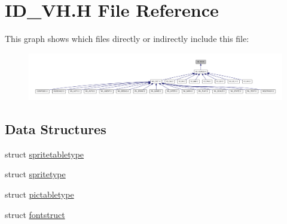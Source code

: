 \hypertarget{ID__VH_8H}{
\section{ID\_\-VH.H File Reference}
\label{ID__VH_8H}
}
This graph shows which files directly or indirectly include this file:
\nopagebreak
\begin{figure}[H]
\begin{center}
\leavevmode
\includegraphics[width=400pt]{ID__VH_8H__dep__incl}
\end{center}
\end{figure}
\subsection*{Data Structures}
\begin{DoxyCompactItemize}
\item 
struct \hyperlink{structspritetabletype}{spritetabletype}
\item 
struct \hyperlink{structspritetype}{spritetype}
\item 
struct \hyperlink{structpictabletype}{pictabletype}
\item 
struct \hyperlink{structfontstruct}{fontstruct}
\end{DoxyCompactItemize}
